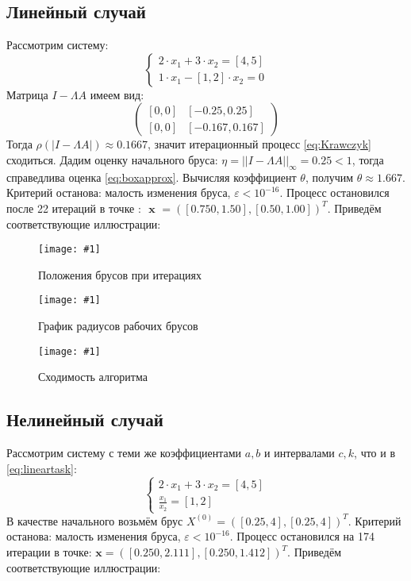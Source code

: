 \documentclass[a4paper,12pt]{article}
\newcommand{\plot}[3]{
    \begin{figure}[H]
        \texttt{[image: \#1]}
        \caption{#2}
        \label{#3}
    \end{figure}
}
\begin{document}
    \subsection{Линейный случай}
    Рассмотрим систему:
    \begin{equation}
        \begin{cases}
            2 \cdot x_{1} + 3 \cdot x_{2} = [4, 5] \\
            1 \cdot x_{1} - [1, 2] \cdot x_{2} = 0
        \end{cases}
        \label{eq:lineartask}
    \end{equation}
    Матрица $ I - \Lambda A $ имеем вид:
    \begin{equation}
        \begin{pmatrix}
            [0, 0] & [-0.25, 0.25] \\
            [0, 0] & [-0.167, 0.167]
        \end{pmatrix}
    \end{equation}
    Тогда $ \rho(|I - \Lambda A|) \approx 0.1667$, значит итерационный процесс \ref{eq:Krawczyk} сходиться.\newline
    Дадим оценку начального бруса:\newline
    $ \eta = || I - \Lambda A ||_{\infty} = 0.25 < 1 $, тогда справедлива оценка \ref{eq:boxapprox}.
    Вычисляя коэффициент $ \theta $, получим $ \theta \approx 1.667 $.\newline
    Критерий останова: малость изменения бруса,  $ \varepsilon < 10^{-16} $.\newline
    Процесс остановился после 22 итераций в точке : $ \textbf{ x } = ([0.750, 1.50], [0.50, 1.00])^{T} $.\newline
    Приведём соответствующие иллюстрации:

    \plot{LinearBoxes}{Положения брусов при итерациях}{p:linearboxes}
    \plot{LinearRads}{График радиусов рабочих брусов}{p:linearrads}
    \plot{LinearConv}{Сходимость алгоритма}{p:linearconv}

    \subsection{Нелинейный случай}
    Рассмотрим систему с теми же коэффициентами $ a, b $ и интервалами $ c, k $, что и в \ref{eq:lineartask}:
    \begin{equation}
        \begin{cases}
            2 \cdot x_{1} + 3 \cdot x_{2} = [4, 5]\\
            \frac{x_{1}}{x_{2}} = [1, 2]
        \end{cases}
        \label{eq:nonlineartask}
    \end{equation}
    В качестве начального возьмём брус $ X^{(0)} = ([0.25, 4], [0.25, 4])^{T} $.\newline
    Критерий останова: малость изменения бруса,  $ \varepsilon < 10^{-16} $.\newline
    Процесс остановился на 174 итерации в точке: $ \textbf{x} = ([0.250, 2.111], [0.250, 1.412])^{T} $.\newline
    Приведём соответствующие иллюстрации:
    
\end{document}
